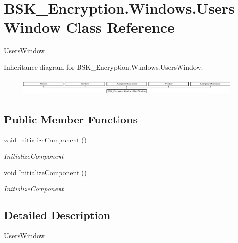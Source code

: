 \hypertarget{class_b_s_k___encryption_1_1_windows_1_1_users_window}{}\section{B\+S\+K\+\_\+\+Encryption.\+Windows.\+Users\+Window Class Reference}
\label{class_b_s_k___encryption_1_1_windows_1_1_users_window}


\mbox{\hyperlink{class_b_s_k___encryption_1_1_windows_1_1_users_window}{Users\+Window}}  


Inheritance diagram for B\+S\+K\+\_\+\+Encryption.\+Windows.\+Users\+Window\+:\begin{figure}[H]
\begin{center}
\leavevmode
\includegraphics[height=0.910569cm]{class_b_s_k___encryption_1_1_windows_1_1_users_window}
\end{center}
\end{figure}
\subsection*{Public Member Functions}
\begin{DoxyCompactItemize}
\item 
void \mbox{\hyperlink{class_b_s_k___encryption_1_1_windows_1_1_users_window_a2c471ea1e3ac60997266866d55f7b202}{Initialize\+Component}} ()
\begin{DoxyCompactList}\small\item\em Initialize\+Component \end{DoxyCompactList}\item 
void \mbox{\hyperlink{class_b_s_k___encryption_1_1_windows_1_1_users_window_a2c471ea1e3ac60997266866d55f7b202}{Initialize\+Component}} ()
\begin{DoxyCompactList}\small\item\em Initialize\+Component \end{DoxyCompactList}\end{DoxyCompactItemize}


\subsection{Detailed Description}
\mbox{\hyperlink{class_b_s_k___encryption_1_1_windows_1_1_users_window}{Users\+Window}} 

